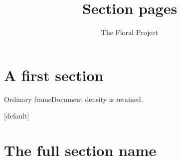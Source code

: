 \documentclass[aspectratio=169]{beamer}
\title{Section pages}
\author{The Floral Project}
\date{}
\begin{document}
\begin{frame}[plain]\titlepage\end{frame}
\section{A first section}
\begin{frame}{Ordinary frame}Document density is retained.\end{frame}
\begin{frame}[plain]\sectionpage\end{frame}
\begin{frame}[plain]
  [default]
  \sectionpage
\end{frame}
\begin{frame}[plain]
\end{frame}
\begin{frame}\sectionpage\end{frame}
\section[Short label]{The full section name}
\end{document}
